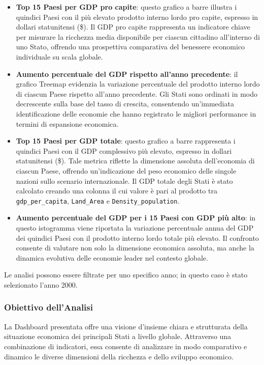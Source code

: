 \vspace{2mm} 
\begin{itemize} 
\item \textbf{Top 15 Paesi per GDP pro capite}: questo grafico a barre illustra i quindici Paesi con il più elevato prodotto interno lordo pro capite, espresso in dollari statunitensi (\$). Il GDP pro capite rappresenta un indicatore chiave per misurare la ricchezza media disponibile per ciascun cittadino all'interno di uno Stato, offrendo una prospettiva comparativa del benessere economico individuale su scala globale.
\item \textbf{Aumento percentuale del GDP rispetto all'anno precedente}: il grafico Treemap evidenzia la variazione percentuale del prodotto interno lordo di ciascun Paese rispetto all'anno precedente. Gli Stati sono ordinati in modo decrescente sulla base del tasso di crescita, consentendo un'immediata identificazione delle economie che hanno registrato le migliori performance in termini di espansione economica.
\item \textbf{Top 15 Paesi per GDP totale}: questo grafico a barre rappresenta i quindici Paesi con il GDP complessivo più elevato, espresso in dollari statunitensi (\$). Tale metrica riflette la dimensione assoluta dell'economia di ciascun Paese, offrendo un'indicazione del peso economico delle singole nazioni sullo scenario internazionale. Il GDP totale degli Stati è stato calcolato creando una colonna il cui valore è pari al prodotto tra \texttt{gdp\_per\_capita}, \texttt{Land\_Area} e \texttt{Density\_population}.
\item \textbf{Aumento percentuale del GDP per i 15 Paesi con GDP più alto}: in questo istogramma viene riportata la variazione percentuale annua del GDP dei quindici Paesi con il prodotto interno lordo totale più elevato. Il confronto consente di valutare non solo la dimensione economica assoluta, ma anche la dinamica evolutiva delle economie leader nel contesto globale.
\end{itemize}
\vspace{2mm}

Le analisi possono essere filtrate per uno specifico anno; in questo caso è stato selezionato l'anno 2000.

\subsubsection{Obiettivo dell'Analisi}
La Dashboard presentata offre una visione d'insieme chiara e strutturata della situazione economica dei principali Stati a livello globale. Attraverso una combinazione di indicatori, essa consente di analizzare in modo comparativo e dinamico le diverse dimensioni della ricchezza e dello sviluppo economico.

